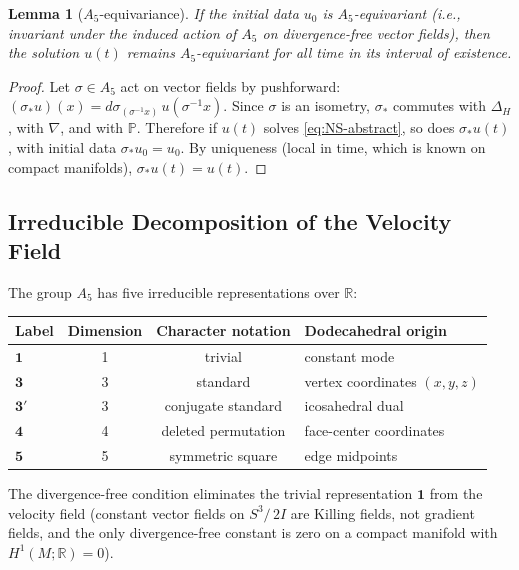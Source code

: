 \documentclass[11pt,a4paper]{article}
\theoremstyle{plain}
\newtheorem{lemma}[theorem]{Lemma}
\theoremstyle{definition}
\newcommand{\R}{\mathbb{R}}
\newcommand{\Lap}{\Delta}                 %
\newcommand{\DS}{S^3\!/\,2I}             %
\begin{document}
\begin{lemma}[$A_5$-equivariance]\label{lem:equivariance}
If the initial data $u_0$ is $A_5$-equivariant (i.e., invariant under the
induced action of $A_5$ on divergence-free vector fields), then the solution
$u(t)$ remains $A_5$-equivariant for all time in its interval of existence.
\end{lemma}

\begin{proof}
Let $\sigma \in A_5$ act on vector fields by pushforward:
$(\sigma_* u)(x) = d\sigma_{(\sigma^{-1}x)}\, u(\sigma^{-1}x)$.  Since
$\sigma$ is an isometry, $\sigma_*$ commutes with $\Lap_H$, with $\nabla$,
and with $\mathbb{P}$.  Therefore if $u(t)$ solves \eqref{eq:NS-abstract},
so does $\sigma_* u(t)$, with initial data $\sigma_* u_0 = u_0$.  By
uniqueness (local in time, which is known on compact manifolds), $\sigma_*
u(t) = u(t)$.
\end{proof}

\subsection{Irreducible Decomposition of the Velocity Field}

The group $A_5$ has five irreducible representations over $\R$:
\begin{center}
\renewcommand{\arraystretch}{1.1}
\begin{tabular}{@{}lccl@{}}
\toprule
Label & Dimension & Character notation & Dodecahedral origin \\
\midrule
$\mathbf{1}$   & 1 & trivial & constant mode \\
$\mathbf{3}$   & 3 & standard & vertex coordinates $(x,y,z)$ \\
$\mathbf{3}'$  & 3 & conjugate standard & icosahedral dual \\
$\mathbf{4}$   & 4 & deleted permutation & face-center coordinates \\
$\mathbf{5}$   & 5 & symmetric square & edge midpoints \\
\bottomrule
\end{tabular}
\end{center}
The divergence-free condition eliminates the trivial representation
$\mathbf{1}$ from the velocity field (constant vector fields on $\DS$ are
Killing fields, not gradient fields, and the only divergence-free constant
is zero on a compact manifold with $H^1(M;\R) = 0$).
\end{document}
